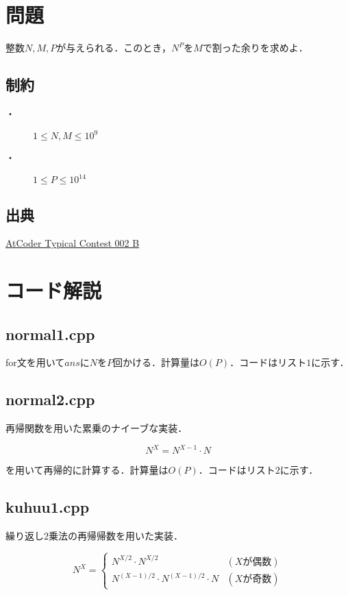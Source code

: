 \documentclass[slide,20pt]{ltjsarticle}
\begin{document}
\setcounter{page}{2}
\section*{問題}
整数$N, M, P$が与えられる．このとき，$N ^ P$を$M$で割った余りを求めよ．

\subsection*{制約}
\begin{description}
\item[・] $1 \leq N, M \leq 10^9$
\item[・] $1 \le P \le 10^{14}$
\end{description}

\subsection*{出典}
\href{https://atcoder.jp/contests/atc002/tasks/atc002_b}{AtCoder Typical Contest 002 B}


\section*{コード解説}
\subsection*{normal1.cpp}
for文を用いて$ans$に$N$を$P$回かける．計算量は$O(P)$．コードはリスト$1$に示す．



\newpage
\subsection*{normal2.cpp}
再帰関数を用いた累乗のナイーブな実装．

\[ N ^ X = N ^ {X - 1} \cdot N \]

を用いて再帰的に計算する．計算量は$O(P)$．コードはリスト$2$に示す．



\newpage

\subsection*{kuhuu1.cpp}
繰り返し$2$乗法の再帰帰数を用いた実装．

\begin{equation*}
  N ^ X = \left\{
    \begin{array}{ll}
      N ^ {X / 2} \cdot N ^ {X / 2} & (X \text{が偶数}) \\
      N ^ {(X - 1) / 2} \cdot N ^ {(X - 1) / 2} \cdot N & (X \text{が奇数})
    \end{array}
  \right.
\end{equation*}
\end{document}
